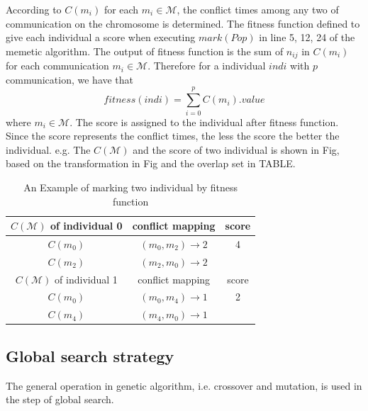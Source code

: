 \documentclass[conference]{IEEEtran}
\begin{document}
According to $C(m_{i})$ for each $m_{i}\in\mathcal{M}$, the conflict times among any two of communication on the chromosome is determined. The fitness function defined to give each individual a score when executing $mark(Pop)$ in line 5, 12, 24 of the memetic algorithm. The output of fitness function is the sum of $n_{ij}$ in $C(m_{i})$ for each communication $m_{i}\in\mathcal{M}$. Therefore for a individual $indi$ with $p$ communication, we have that
\begin{equation}
	fitness(indi)=\sum_{i=0}^p {C(m_i).value}
\end{equation}
where $m_i\in\mathcal{M}$. The score is assigned to the individual after fitness function. Since the score represents the conflict times, the less the score the better the individual. e.g. The $C(\mathcal{M})$ and the score of two individual is shown in Fig, based on the transformation in Fig and the overlap set in TABLE. 

\begin{table}[!t]
	\renewcommand{\arraystretch}{1.3}
	\caption{An Example of marking two individual by fitness function}
	\label{score fig}
	\centering
	\begin{tabular}{|c||c||c|}
		\hline
		$C(\mathcal{M})$ of individual 0 & conflict mapping & score\\
		\hline 
		$C(m_{0})$ & $ (m_0,m_2)\rightarrow 2$ & 4 \\
		\hline  
		$C(m_{2})$ & $ (m_2,m_0)\rightarrow 2$	&  \\
		\hline
			\hline
			$C(\mathcal{M})$ of individual 1 & conflict mapping & score\\
			\hline 
			$C(m_{0})$ & $ (m_0,m_4)\rightarrow 1$ & 2 \\
			\hline  
			$C(m_{4})$ & $ (m_4,m_0)\rightarrow 1$	&  \\
			\hline	
	\end{tabular}	

\end{table}

\subsection{Global search strategy}

The general operation in genetic algorithm, i.e. crossover and mutation, is used in the step of global search. 
\end{document}
